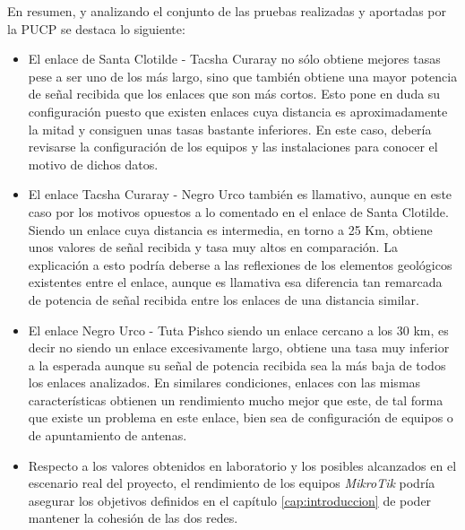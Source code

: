 En resumen, y analizando el conjunto de las pruebas realizadas y aportadas por la PUCP se destaca lo siguiente:

\begin{itemize}
	\item El enlace de Santa Clotilde - Tacsha Curaray no sólo obtiene mejores tasas pese a ser uno de los más largo, sino que también obtiene una mayor potencia de señal recibida que los enlaces que son más cortos. Esto pone en duda su configuración puesto que existen enlaces cuya distancia es aproximadamente la mitad y consiguen unas tasas bastante inferiores. En este caso, debería revisarse la configuración de los equipos y las instalaciones para conocer el motivo de dichos datos. 
	
	\item El enlace Tacsha Curaray - Negro Urco también es llamativo, aunque en este caso por los motivos opuestos a lo comentado en el enlace de Santa Clotilde. Siendo un enlace cuya distancia es intermedia, en torno a 25 Km, obtiene unos valores de señal recibida y tasa muy altos en comparación. La explicación a esto podría deberse a las reflexiones de los elementos geológicos existentes entre el enlace, aunque es llamativa esa diferencia tan remarcada de potencia de señal recibida entre los enlaces de una distancia similar.
	
	\item El enlace Negro Urco - Tuta Pishco siendo un enlace cercano a los 30 km, es decir no siendo un enlace excesivamente largo, obtiene una tasa muy inferior a la esperada aunque su señal de potencia recibida sea la más baja de todos los enlaces analizados. En similares condiciones, enlaces con las mismas características obtienen un rendimiento mucho mejor que este, de tal forma que existe un problema en este enlace, bien sea de configuración de equipos o de apuntamiento de antenas.
	
	\item Respecto a los valores obtenidos en laboratorio y los posibles alcanzados en el escenario real del proyecto, el rendimiento de los equipos \textit{MikroTik} podría asegurar los objetivos definidos en el capítulo \ref{cap:introduccion} de poder mantener la cohesión de las dos redes. 
\end{itemize}

